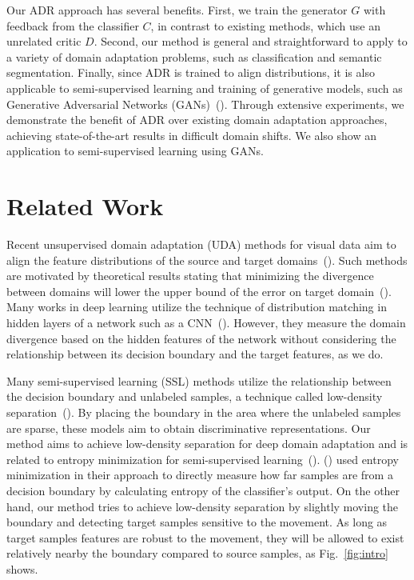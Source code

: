 \documentclass{article} \usepackage{iclr2018_conference,times}
\begin{document}
Our ADR approach has several benefits.
First, we train the generator $G$ with feedback from the classifier $C$, in contrast to existing methods, which use an unrelated critic $D$.
Second, our method is general and straightforward to apply to a variety of domain adaptation problems, such as classification and semantic segmentation.
Finally, since ADR is trained to align distributions, it is also applicable to semi-supervised learning and training of generative models, such as Generative Adversarial Networks (GANs)~(\cite{goodfellow2014generative}). Through extensive experiments, we demonstrate the benefit of ADR over existing domain adaptation approaches, achieving state-of-the-art results in difficult domain shifts. We also show an application to semi-supervised learning using GANs.


\section{Related Work}\label{sec:related}
\vspace{-3mm}        

Recent unsupervised domain adaptation (UDA) methods for visual data aim to align the feature distributions of the source and target domains~(\cite{sun2016return,sun2016deep,tzeng2014deep,ganin2016domain,long2015learning,yan2017mind,long2016deep}). Such methods are motivated by theoretical results stating that minimizing the divergence between domains will lower the upper bound of the error on target domain~(\cite{ben2010theory}). 
Many works in deep learning utilize the technique of distribution matching in hidden layers of a network such as a CNN~(\cite{tzeng2014deep,ganin2016domain,long2015learning}). However, they measure the domain divergence based on the hidden features of the network without considering the relationship between its decision boundary and the target features, as we do.


 Many semi-supervised learning (SSL) methods utilize the relationship between the decision boundary and unlabeled samples, a technique called low-density separation~(\cite{chapelle2005semi,joachims1999transductive}). By placing the boundary in the area where the unlabeled samples are sparse, these models aim to obtain discriminative representations.
Our method aims to achieve low-density separation for deep domain adaptation and is related to entropy minimization for semi-supervised learning~(\cite{grandvalet2005semi}). (\cite{long2016unsupervised}) used entropy minimization in their approach to directly measure how far samples are from a decision boundary by calculating entropy of the classifier's output. On the other hand, our method tries to achieve low-density separation by slightly moving the boundary and detecting target samples sensitive to the movement. As long as target samples features are robust to the movement, they will be allowed to exist relatively nearby the boundary compared to source samples, as Fig.~\ref{fig:intro} shows. 
\end{document}
